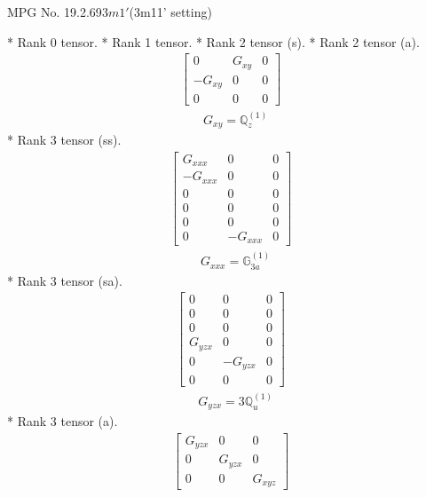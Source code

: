 \documentclass[fleqn,8pt,landscape]{jsarticle}
\begin{document}
\setcounter{MaxMatrixCols}{32}

\renewcommand{\tablename}{Table~}
\renewcommand{\figurename}{Figure~}
\begin{center}
\LARGE
MPG No. 19.2.69\quad$3m1'$\quad(3m11' setting)
\end{center}
* Rank 0 tensor.
* Rank 1 tensor.
* Rank 2 tensor (s).
* Rank 2 tensor (a).
\begin{align*}
\begin{bmatrix} 0 & G_{xy} & 0 \\ - G_{xy} & 0 & 0 \\ 0 & 0 & 0 \end{bmatrix}
\end{align*}
\begin{align*}
& G_{xy} = \mathbb{Q}_{z}^{(1)}
\end{align*}
* Rank 3 tensor (ss).
\begin{align*}
\begin{bmatrix} G_{xxx} & 0 & 0 \\ - G_{xxx} & 0 & 0 \\ 0 & 0 & 0 \\ 0 & 0 & 0 \\ 0 & 0 & 0 \\ 0 & - G_{xxx} & 0 \end{bmatrix}
\end{align*}
\begin{align*}
& G_{xxx} = \mathbb{G}_{3a}^{(1)}
\end{align*}
* Rank 3 tensor (sa).
\begin{align*}
\begin{bmatrix} 0 & 0 & 0 \\ 0 & 0 & 0 \\ 0 & 0 & 0 \\ G_{yzx} & 0 & 0 \\ 0 & - G_{yzx} & 0 \\ 0 & 0 & 0 \end{bmatrix}
\end{align*}
\begin{align*}
& G_{yzx} = 3 \mathbb{Q}_{u}^{(1)}
\end{align*}
* Rank 3 tensor (a).
\begin{align*}
\begin{bmatrix} G_{yzx} & 0 & 0 \\ 0 & G_{yzx} & 0 \\ 0 & 0 & G_{xyz} \end{bmatrix}
\end{align*}
\end{document}
